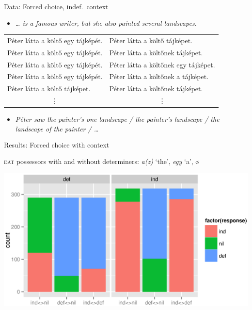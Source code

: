 \documentclass[12pt]{beamer}
\begin{document}
\begin{frame}{Data: Forced choice, indef.\ context}

\begin{itemize}
    \item \emph{\dots{} is a famous writer, but she also painted \alert{several} landscapes.}
\end{itemize}

\begin{tabulary}{1\linewidth}{ll}
Péter látta a költő \textcolor{red!70!black}{egy} tájképét. & Péter látta a költő tájképet.\\
Péter látta a költő \textcolor{red!70!black}{egy} tájképét. & Péter látta a költőnek tájképet.\\
Péter látta a költő \textcolor{red!70!black}{egy} tájképét. & Péter látta a költőnek \textcolor{red!70!black}{egy} tájképet.\\
Péter látta a költő \textcolor{red!70!black}{egy} tájképét. & Péter látta a költőnek \alert{a} tájképet.\\
Péter látta a költő tájképet.     & Péter látta a költőnek tájképet.\\
 & \\
\end{tabulary}

\begin{itemize}
    \item \emph{Péter saw the painter's \textcolor{red!70!black}{one} landscape / the painter's landscape / \alert{the} landscape of the painter / \dots}
\end{itemize}

\end{frame}

\begin{frame}{Results: Forced choice with context}

    \textsc{dat} possessors with and without determiners: \emph{a(z)} `the', \emph{egy} `a', ø

    \includegraphics[width=1.1\linewidth]{ContextFC.eps}

\end{frame}
\end{document}
